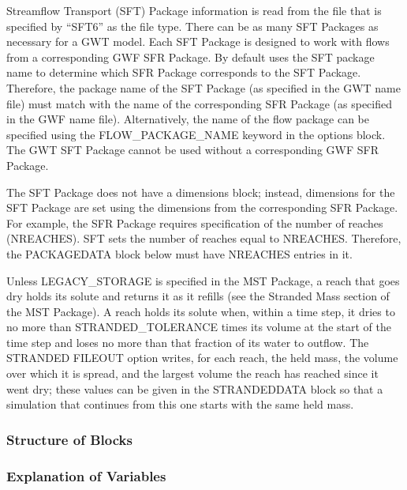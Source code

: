 Streamflow Transport (SFT) Package information is read from the file that is specified by ``SFT6'' as the file type.  There can be as many SFT Packages as necessary for a GWT model. Each SFT Package is designed to work with flows from a corresponding GWF SFR Package. By default \mf uses the SFT package name to determine which SFR Package corresponds to the SFT Package.  Therefore, the package name of the SFT Package (as specified in the GWT name file) must match with the name of the corresponding SFR Package (as specified in the GWF name file).  Alternatively, the name of the flow package can be specified using the FLOW\_PACKAGE\_NAME keyword in the options block.  The GWT SFT Package cannot be used without a corresponding GWF SFR Package.

The SFT Package does not have a dimensions block; instead, dimensions for the SFT Package are set using the dimensions from the corresponding SFR Package.  For example, the SFR Package requires specification of the number of reaches (NREACHES).  SFT sets the number of reaches equal to NREACHES.  Therefore, the PACKAGEDATA block below must have NREACHES entries in it.

Unless LEGACY\_STORAGE is specified in the MST Package, a reach that goes dry holds its solute and returns it as it refills (see the Stranded Mass section of the MST Package).  A reach holds its solute when, within a time step, it dries to no more than STRANDED\_TOLERANCE times its volume at the start of the time step and loses no more than that fraction of its water to outflow.  The STRANDED FILEOUT option writes, for each reach, the held mass, the volume over which it is spread, and the largest volume the reach has reached since it went dry; these values can be given in the STRANDEDDATA block so that a simulation that continues from this one starts with the same held mass.

\vspace{5mm}
\subsubsection{Structure of Blocks}





\vspace{5mm}
\subsubsection{Explanation of Variables}
\begin{description}

\end{description}

